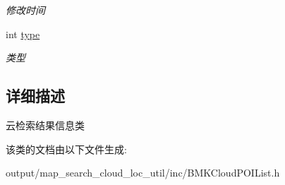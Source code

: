 \begin{DoxyCompactItemize}
\begin{DoxyCompactList}\small\item\em 修改时间 \end{DoxyCompactList}\item 
\hypertarget{interface_b_m_k_cloud_p_o_i_info_a7a51645c4ec8dcfa08ae4624749878cb}{int \hyperlink{interface_b_m_k_cloud_p_o_i_info_a7a51645c4ec8dcfa08ae4624749878cb}{type}}\label{interface_b_m_k_cloud_p_o_i_info_a7a51645c4ec8dcfa08ae4624749878cb}

\begin{DoxyCompactList}\small\item\em 类型 \end{DoxyCompactList}\end{DoxyCompactItemize}


\subsection{详细描述}
云检索结果信息类 

该类的文档由以下文件生成\+:\begin{DoxyCompactItemize}
\item 
output/map\+\_\+search\+\_\+cloud\+\_\+loc\+\_\+util/inc/B\+M\+K\+Cloud\+P\+O\+I\+List.\+h\end{DoxyCompactItemize}
